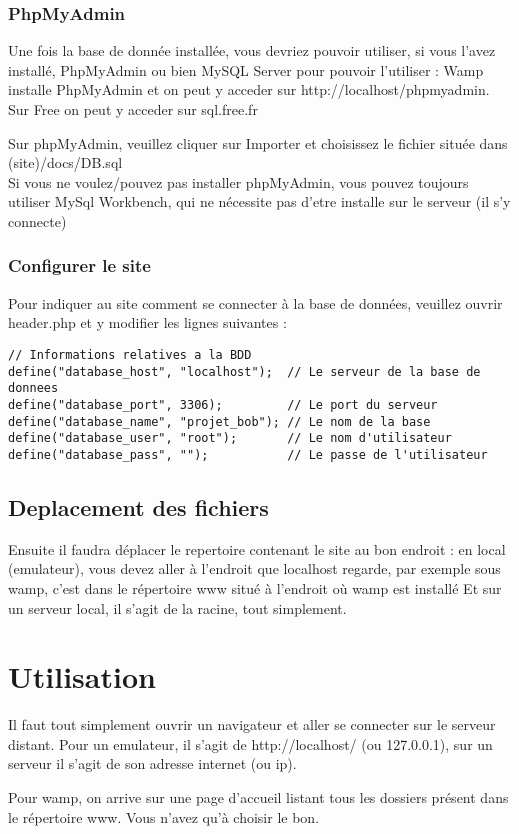 	\subsubsection{PhpMyAdmin}
	Une fois la base de donnée installée, vous devriez pouvoir utiliser, si vous l'avez installé, PhpMyAdmin ou bien MySQL Server pour pouvoir l'utiliser : Wamp installe PhpMyAdmin et on peut y acceder sur http://localhost/phpmyadmin.\\
	Sur Free on peut y acceder sur sql.free.fr
	
	Sur phpMyAdmin, veuillez cliquer sur Importer et choisissez le fichier située dans (site)/docs/DB.sql\\
	
	Si vous ne voulez/pouvez pas installer phpMyAdmin, vous pouvez toujours utiliser MySql Workbench, qui ne nécessite pas d'etre installe sur le serveur (il s'y connecte)
	
	\subsubsection{Configurer le site}
	
	Pour indiquer au site comment se connecter à la base de données, veuillez ouvrir header.php et y modifier les lignes suivantes :
	\lstset{language=PHP}
	\begin{lstlisting}
// Informations relatives a la BDD
define("database_host", "localhost");  // Le serveur de la base de donnees
define("database_port", 3306);         // Le port du serveur 
define("database_name", "projet_bob"); // Le nom de la base
define("database_user", "root");       // Le nom d'utilisateur
define("database_pass", "");           // Le passe de l'utilisateur
	\end{lstlisting}
	
\subsection{Deplacement des fichiers}
	
	Ensuite il faudra déplacer le repertoire contenant le site au bon endroit : en local (emulateur), vous devez aller à l'endroit que localhost regarde, par exemple sous wamp, c'est dans le répertoire www situé à l'endroit où wamp est installé
	Et sur un serveur local, il s'agit de la racine, tout simplement.
\section{Utilisation}

	Il faut tout simplement ouvrir un navigateur et aller se connecter sur le serveur distant.
	Pour un emulateur, il s'agit de http://localhost/ (ou 127.0.0.1), sur un serveur il s'agit de son adresse internet (ou ip).
	
	Pour wamp, on arrive sur une page d'accueil listant tous les dossiers présent dans le répertoire www. Vous n'avez qu'à choisir le bon.